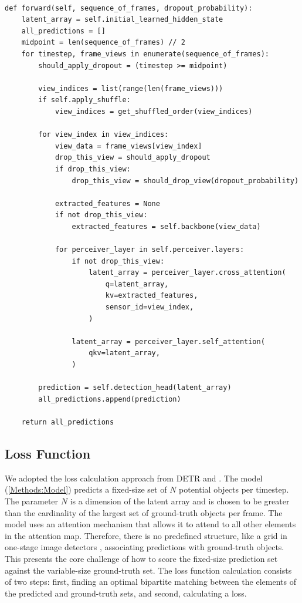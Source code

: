 \begin{verbatim}

def forward(self, sequence_of_frames, dropout_probability):
    latent_array = self.initial_learned_hidden_state
    all_predictions = []
    midpoint = len(sequence_of_frames) // 2
    for timestep, frame_views in enumerate(sequence_of_frames):
        should_apply_dropout = (timestep >= midpoint)

        view_indices = list(range(len(frame_views)))
        if self.apply_shuffle:
            view_indices = get_shuffled_order(view_indices)

        for view_index in view_indices:
            view_data = frame_views[view_index]
            drop_this_view = should_apply_dropout
            if drop_this_view:
                drop_this_view = should_drop_view(dropout_probability)

            extracted_features = None
            if not drop_this_view:
                extracted_features = self.backbone(view_data)

            for perceiver_layer in self.perceiver.layers:
                if not drop_this_view:
                    latent_array = perceiver_layer.cross_attention(
                        q=latent_array,
                        kv=extracted_features,
                        sensor_id=view_index,
                    )

                latent_array = perceiver_layer.self_attention(
                    qkv=latent_array,
                )

        prediction = self.detection_head(latent_array)
        all_predictions.append(prediction)

    return all_predictions

\end{verbatim}


\subsection{Loss Function} \label{Methods:LossFunction}

We adopted the loss calculation approach from DETR \cite{carionEndtoEndObjectDetection2020} and \cite{stewartEndtoendPeopleDetection2015}. The model (\ref{Methods:Model}) predicts a fixed-size set of $N$ potential objects per timestep. The parameter $N$ is a dimension of the latent array and is chosen to be greater than the cardinality of the largest set of ground-truth objects per frame. The model uses an attention mechanism that allows it to attend to all other elements in the attention map. Therefore, there is no predefined structure, like a grid in one-stage image detectors \cite{redmonYouOnlyLook2016}, associating predictions with ground-truth objects. This presents the core challenge of how to score the fixed-size prediction set against the variable-size ground-truth set. The loss function calculation consists of two steps: first, finding an optimal bipartite matching between the elements of the predicted and ground-truth sets, and second, calculating a loss.

